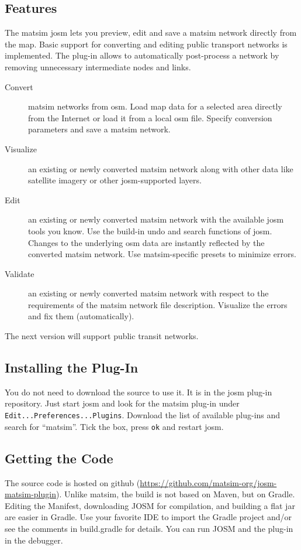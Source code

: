 \subsection{Features}
The \gls{matsim} \gls{josm} lets you preview, edit and save a \gls{matsim} network directly from the map. Basic support for converting and editing public transport networks is implemented. The plug-in allows to automatically post-process a network by removing unnecessary intermediate nodes and links.
\begin{description}
\item[Convert] \gls{matsim} networks from \gls{osm}. Load map data for a selected area directly from the Internet or load it from a local osm file. Specify conversion parameters and save a \gls{matsim} network.
\item[Visualize] an existing or newly converted \gls{matsim} network along with other data like satellite imagery or other \gls{josm}-supported layers.
\item[Edit] an existing or newly converted \gls{matsim} network with the available \gls{josm} tools you know. Use the build-in undo and search functions of \gls{josm}. Changes to the underlying \gls{osm} data are instantly reflected by the converted \gls{matsim} network. Use \gls{matsim}-specific presets to minimize errors.
\item[Validate] an existing or newly converted \gls{matsim} network with respect to the requirements of the \gls{matsim} network file description. Visualize the errors and fix them (automatically). 
\end{description}
The next version will support public transit networks.

\subsection{Installing the Plug-In}
You do not need to download the source to use it. It is in the \gls{josm} plug-in repository. Just start \gls{josm} and look for the \gls{matsim} plug-in under \lstinline|Edit...Preferences...Plugins|. Download the list of available plug-ins and search for ``matsim''. Tick the box, press \lstinline|ok| and restart \gls{josm}.

\subsection{Getting the Code}
The source code is hosted on github (\url{https://github.com/matsim-org/josm-matsim-plugin}). Unlike \gls{matsim}, the build is not based on Maven, but on Gradle. Editing the Manifest, downloading JOSM for compilation, and building a flat jar are easier in Gradle. Use your favorite IDE to import the Gradle project and/or see the comments in build.gradle for details. You can run JOSM and the plug-in in the debugger.
 
